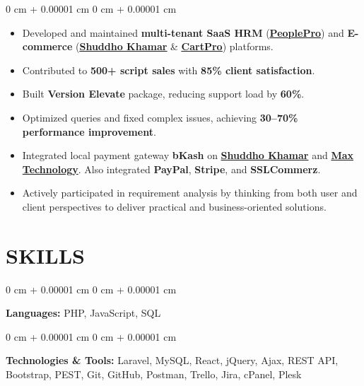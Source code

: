 \documentclass[10pt, letterpaper]{article}
\newenvironment{highlights}{
    \begin{itemize}[
        topsep=0.10 cm,
        parsep=0.10 cm,
        partopsep=0pt,
        itemsep=0pt,
        leftmargin=0 cm + 10pt
    ]
}{
    \end{itemize}
} %
\newenvironment{onecolentry}{
    \begin{adjustwidth}{
        0 cm + 0.00001 cm
    }{
        0 cm + 0.00001 cm
    }
}{
    \end{adjustwidth}
} %
\begin{document}
    \begin{onecolentry}
        \begin{highlights}

            \item Developed and maintained \textbf{multi-tenant SaaS HRM}
            (\href{https://peopleprohrm.com/demo/}{\textbf{\underline{PeoplePro}}})
            and \textbf{E-commerce}
            (\href{https://shuddhokhamar.com}{\textbf{\underline{Shuddho Khamar}}} \& \href{https://xenarchs.com/cartpro/}{\textbf{\underline{CartPro}}}) platforms.

            \item Contributed to \textbf{500+ script sales} with
            \textbf{85\% client satisfaction}.

            \item Built \textbf{Version Elevate} package, reducing
            support load by \textbf{60\%}.

            \item Optimized queries and fixed complex issues, achieving
            \textbf{30--70\% performance improvement}.

            \item Integrated local payment gateway \textbf{bKash} on
            \href{https://shuddhokhamar.com/}{\textbf{Shuddho Khamar}}
            and \href{https://maxonline.com.bd/}{\textbf{Max Technology}}.
            Also integrated \textbf{PayPal}, \textbf{Stripe}, and
            \textbf{SSLCommerz}.

            \item Actively participated in requirement analysis by thinking
            from both user and client perspectives to deliver practical
            and business-oriented solutions.

        \end{highlights}
    \end{onecolentry}

    \vspace{0.20 cm}
    \section{SKILLS}
    \begin{onecolentry}
        \textbf{Languages:} PHP, JavaScript, SQL
    \end{onecolentry}
    \vspace{0.10 cm}
    \begin{onecolentry}
        \textbf{Technologies \& Tools:} Laravel, MySQL, React, jQuery, Ajax, REST API, Bootstrap, PEST, Git, GitHub, Postman, Trello, Jira, cPanel, Plesk
    \end{onecolentry}
\end{document}
